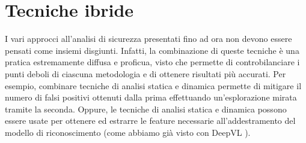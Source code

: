 \documentclass[../main.tex]{subfiles}
\begin{document}
\section{Tecniche ibride}
I vari approcci all'analisi di sicurezza presentati fino ad ora non devono essere pensati come insiemi disgiunti. Infatti, la combinazione di queste tecniche è una pratica estremamente diffusa e proficua, visto che permette
di controbilanciare i punti deboli di ciascuna metodologia e di ottenere risultati più accurati. Per esempio, combinare tecniche di analisi statica e dinamica permette di mitigare il numero di falsi positivi ottenuti dalla prima
effettuando un'esplorazione mirata tramite la seconda. Oppure, le tecniche di analisi statica e dinamica possono essere usate per ottenere ed estrarre le feature necessarie all'addestramento del modello di riconoscimento (come abbiamo già visto con DeepVL \cite{DeepVL}).
\end{document}
